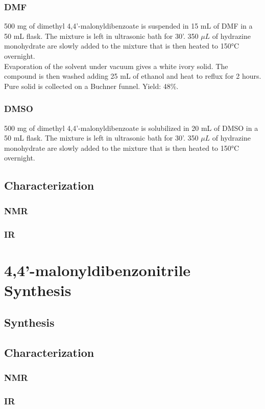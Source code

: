 \documentclass[../Master.tex]{subfiles}
\begin{document}
\subsubsection{DMF}
500 mg of dimethyl 4,4'-malonyldibenzoate is suspended in 15 mL of DMF in a 50 mL flask. The mixture is left in ultrasonic bath for 30'. 350 \(\mu L\) of hydrazine monohydrate are slowly added to the mixture that is then heated to 150°C overnight.\\
Evaporation of the solvent under vacuum gives a white ivory solid. The compound is then washed adding 25 mL of ethanol and heat to reflux for 2 hours. Pure solid is collected on a Buchner funnel. Yield: 48\%.
\subsubsection{DMSO}
500 mg of dimethyl 4,4'-malonyldibenzoate is solubilized in 20 mL of DMSO in a 50 mL flask. The mixture is left in ultrasonic bath for 30'. 350 \(\mu L\) of hydrazine monohydrate are slowly added to the mixture that is then heated to 150°C overnight.\\
\subsection{Characterization}
\subsubsection{NMR}
\subsubsection{IR}
\section{4,4'-malonyldibenzonitrile Synthesis}
\subsection{Synthesis}
\subsection{Characterization}
\subsubsection{NMR}
\subsubsection{IR}
\end{document}
